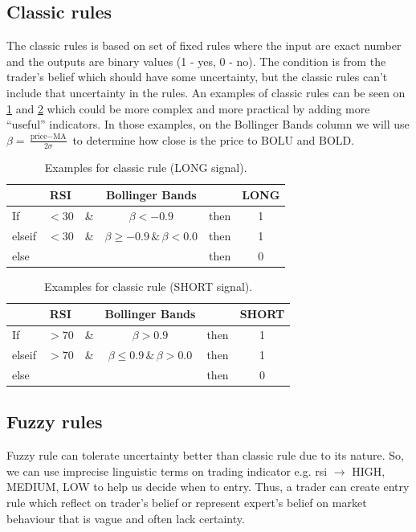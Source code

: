 \documentclass{article}
\begin{document}
\subsection*{Classic rules}
The classic rules is based on set of fixed rules where the input are exact number and the outputs are binary values (1 - yes, 0 - no). 
The condition is from the trader's belief which should have some uncertainty, but the classic rules can't include that uncertainty in the rules.
An examples of classic rules can be seen on \cref{table:1} and \cref{table:2} which could be more complex and more 
practical by adding more ``useful'' indicators. In those examples, on the Bollinger Bands column we will use 
$\beta =\frac{\text{price} - \text{MA}}{2\sigma}$ to determine how close is the price to $\text{BOLU}$ and $\text{BOLD}$.
\begin{table}[htp]
	\centering
	\begin{tabular}{l c c c c c}
		\toprule
        {} & {RSI} & {} & {Bollinger Bands} & {} & {LONG} \\ 
        \midrule
        If & $<30$ & \& & $\beta < -0.9 $ & then & 1 \\
        elseif & $<30$ & \& & $\beta \geq -0.9 \,\&\, \beta < 0.0$ & then & 1 \\
        else &  &  &  & then & 0 \\
        \bottomrule
    \end{tabular} 
    \caption{Examples for classic rule (LONG signal).}
	\label{table:1}
\end{table}
\begin{table}[htp]
	\centering
	\begin{tabular}{l c c c c c}
		\toprule
        {} & {RSI} & {} & {Bollinger Bands} & {} & {SHORT} \\ 
        \midrule
        If & $ >70$ & \& & $\beta > 0.9$ & then & 1 \\
        elseif & $ >70$ & \& & $\beta \leq 0.9 \,\&\, \beta > 0.0$ & then & 1 \\
        else &  &  &  & then & 0 \\
        \bottomrule
    \end{tabular} 
    \caption{Examples for classic rule (SHORT signal).}
	\label{table:2}
\end{table}

\subsection*{Fuzzy rules}
Fuzzy rule can tolerate uncertainty better than classic rule due to its nature. So, we can use imprecise linguistic terms on 
trading indicator e.g. rsi $\rightarrow$ HIGH, MEDIUM, LOW to help us decide when to entry. Thus, a trader can create entry rule 
which reflect on trader's belief or represent expert's belief on market behaviour that is vague and often lack certainty.
\end{document}
